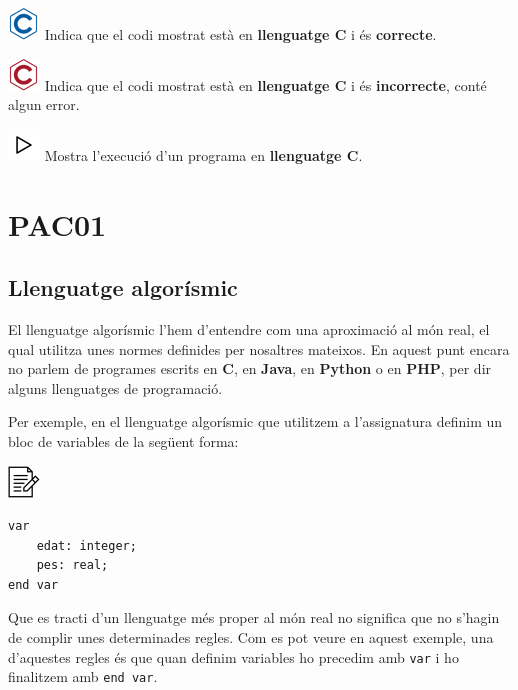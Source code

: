 \documentclass[
]{book}
\begin{document}
\includegraphics{./img/c.png} Indica que el codi mostrat està en \textbf{llenguatge C} i és \textbf{correcte}.

\includegraphics{./img/c_err.png} Indica que el codi mostrat està en \textbf{llenguatge C} i és \textbf{incorrecte}, conté algun error.

\includegraphics{./img/play.png} Mostra l'execució d'un programa en \textbf{llenguatge C}.

\hypertarget{pac01}{%
\chapter{PAC01}\label{pac01}}

\hypertarget{llenguatge-algoruxedsmic}{%
\section{Llenguatge algorísmic}\label{llenguatge-algoruxedsmic}}

El llenguatge algorísmic l'hem d'entendre com una aproximació al món real, el qual utilitza unes normes definides per nosaltres mateixos. En aquest punt encara no parlem de programes escrits en \textbf{C}, en \textbf{Java}, en \textbf{Python} o en \textbf{PHP}, per dir alguns llenguatges de programació.

Per exemple, en el llenguatge algorísmic que utilitzem a l'assignatura definim un bloc de variables de la següent forma:

\includegraphics{./img/alg.png}

\begin{verbatim}
var
    edat: integer;
    pes: real;
end var
\end{verbatim}

Que es tracti d'un llenguatge més proper al món real no significa que no s'hagin de complir unes determinades regles. Com es pot veure en aquest exemple, una d'aquestes regles és que quan definim variables ho precedim amb \texttt{var} i ho finalitzem amb \texttt{end\ var}.
\end{document}
